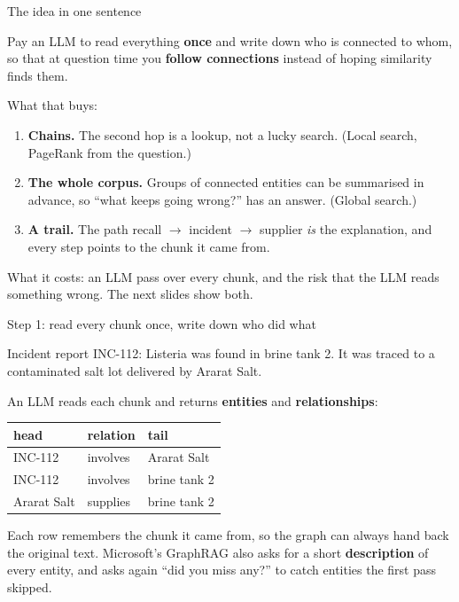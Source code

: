 \documentclass[aspectratio=169]{beamer}
\newcommand{\watchbox}[1]{%
  \begin{tcolorbox}[colback=armorange!12, colframe=armorange, boxrule=0.6pt, arc=2pt]
  #1
  \end{tcolorbox}}
\newcommand{\quotebox}[1]{%
  \begin{center}
  \begin{tcolorbox}[colback=lightbg, colframe=gray, boxrule=0.5pt, arc=2pt, width=0.88\textwidth]
    \small #1
  \end{tcolorbox}
  \end{center}}
\begin{document}
\begin{frame}{The idea in one sentence}
  \quotebox{Pay an LLM to read everything \textbf{once} and write down who is connected to whom, so
  that at question time you \textbf{follow connections} instead of hoping similarity finds them.}

  \vspace{-0.2em}
  What that buys:

  \vspace{0.1em}
  \begin{enumerate}\setlength{\itemsep}{1pt}
    \item \textbf{Chains.} The second hop is a lookup, not a lucky search. (Local search, PageRank
      from the question.)
    \item \textbf{The whole corpus.} Groups of connected entities can be summarised in advance, so
      ``what keeps going wrong?'' has an answer. (Global search.)
    \item \textbf{A trail.} The path recall $\to$ incident $\to$ supplier \emph{is} the explanation,
      and every step points to the chunk it came from.
  \end{enumerate}

  \vspace{0.2em}
  \watchbox{\small What it costs: an LLM pass over every chunk, and the risk that the LLM reads
  something wrong. The next slides show both.}
\end{frame}

\begin{frame}{Step 1: read every chunk once, write down who did what}
  \vspace{0.1em}
  \quotebox{Incident report INC-112: Listeria was found in brine tank 2. It was traced to a
  contaminated salt lot delivered by Ararat Salt.}

  \vspace{-0.2em}
  An LLM reads each chunk and returns \textbf{entities} and \textbf{relationships}:

  \vspace{0.2em}
  \begin{center}
  \small
  \begin{tabular}{lll}
    \toprule
    \textbf{head} & \textbf{relation} & \textbf{tail} \\
    \midrule
    INC-112 & involves & Ararat Salt \\
    INC-112 & involves & brine tank 2 \\
    Ararat Salt & supplies & brine tank 2 \\
    \bottomrule
  \end{tabular}
  \end{center}

  \vspace{0.2em}
  {\small Each row remembers the chunk it came from, so the graph can always hand back the original
  text. Microsoft's GraphRAG also asks for a short \textbf{description} of every entity, and asks
  again ``did you miss any?'' to catch entities the first pass skipped.}
\end{frame}
\end{document}
